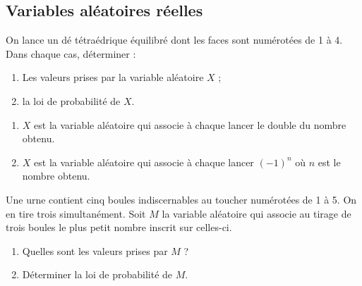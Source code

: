 \documentclass[a4paper,11pt,exos]{nsi} %
\begin{document}
\setlength{\columnseprule}{0pt}
\setlength{\columnsep}{1cm}

\maketitle

\subsection*{Variables aléatoires réelles}

\exo{}
On lance un dé tétraédrique équilibré dont les faces sont numérotées de 1 à 4. Dans chaque cas, déterminer :
\begin{enumerate}[label=\textbullet]
	\item 	Les valeurs prises par la variable aléatoire $X$ ;
	\item 	la loi de probabilité de $X$.	
\end{enumerate}
\begin{enumerate}
	\item 	$X$ est la variable aléatoire qui associe à chaque lancer le double du nombre obtenu.
	\item 	$X$ est la variable aléatoire qui associe à chaque lancer $(-1)^n$ où $n$ est le nombre obtenu.	
\end{enumerate}


\exo{}
Une urne contient cinq boules indiscernables au toucher numérotées de 1 à 5. On en tire trois simultanément. Soit $M$ la variable aléatoire qui associe au tirage de trois boules le plus petit nombre inscrit sur celles-ci.
\begin{enumerate}
	\item 	Quelles sont les valeurs prises par $M$ ?
	\item 	Déterminer la loi de probabilité de $M$.	
\end{enumerate}
\end{document}
